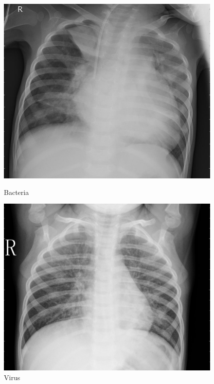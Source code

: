 \documentclass{article}
\begin{document}
\begin{figure}[!htb]
  \includegraphics[width=\linewidth]{assets/intro/scan-bacteria.jpeg}
  \caption*{Bacteria}\label{fig:scan-bacteria}
\endminipage\hfill
{}
  \includegraphics[width=\linewidth]{assets/intro/scan-virus.jpeg}
  \caption*{Virus}\label{fig:scan-virus}
\endminipage\hfill
{}%

\end{figure}
\end{document}
